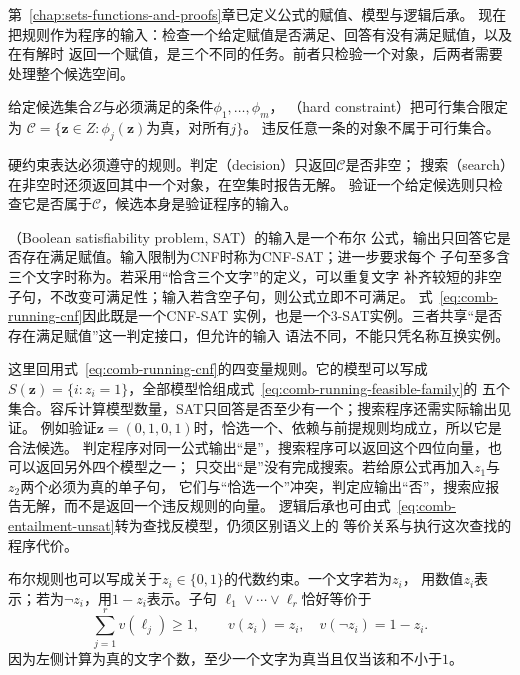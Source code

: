 第~\ref{chap:sets-functions-and-proofs}章已定义公式的赋值、模型与逻辑后承。
现在把规则作为程序的输入：检查一个给定赋值是否满足、回答有没有满足赋值，以及在有解时
返回一个赋值，是三个不同的任务。前者只检验一个对象，后两者需要处理整个候选空间。

\begin{definition}[硬约束]
\label{def:comb-hard-constraint}
给定候选集合$Z$与必须满足的条件$\phi_1,\ldots,\phi_m$，
（hard constraint）把可行集合限定为
$\mathcal C=\{\bm z\in Z:\phi_j(\bm z)\text{为真，对所有}j\}$。
违反任意一条的对象不属于可行集合。
\end{definition}
硬约束表达必须遵守的规则。判定（decision）只返回$\mathcal C$是否非空；
搜索（search）在非空时还须返回其中一个对象，在空集时报告无解。
验证一个给定候选则只检查它是否属于$\mathcal C$，候选本身是验证程序的输入。

（Boolean satisfiability problem, SAT）的输入是一个布尔
公式，输出只回答它是否存在满足赋值。输入限制为CNF时称为CNF-SAT；进一步要求每个
子句至多含三个文字时称为。若采用“恰含三个文字”的定义，可以重复文字
补齐较短的非空子句，不改变可满足性；输入若含空子句，则公式立即不可满足。
式~\eqref{eq:comb-running-cnf}因此既是一个CNF-SAT
实例，也是一个3-SAT实例。三者共享“是否存在满足赋值”这一判定接口，但允许的输入
语法不同，不能只凭名称互换实例。

这里回用式~\eqref{eq:comb-running-cnf}的四变量规则。它的模型可以写成
$S(\bm z)=\{i:z_i=1\}$，全部模型恰组成式~\eqref{eq:comb-running-feasible-family}的
五个集合。容斥计算模型数量，SAT只回答是否至少有一个；搜索程序还需实际输出见证。
例如验证$\bm z=(0,1,0,1)$时，恰选一个、依赖与前提规则均成立，所以它是合法候选。
判定程序对同一公式输出“是”，搜索程序可以返回这个四位向量，也可以返回另外四个模型之一；
只交出“是”没有完成搜索。若给原公式再加入$z_1$与$z_2$两个必须为真的单子句，
它们与“恰选一个”冲突，判定应输出“否”，搜索应报告无解，而不是返回一个违反规则的向量。
逻辑后承也可由式~\eqref{eq:comb-entailment-unsat}转为查找反模型，仍须区别语义上的
等价关系与执行这次查找的程序代价。

布尔规则也可以写成关于$z_i\in\{0,1\}$的代数约束。一个文字若为$z_i$，
用数值$z_i$表示；若为$\neg z_i$，用$1-z_i$表示。子句
$\ell_1\lor\cdots\lor\ell_r$恰好等价于
\begin{equation}
  \sum_{j=1}^{r}v(\ell_j)\geq1,
  \qquad
  v(z_i)=z_i,\quad v(\neg z_i)=1-z_i.
  \label{eq:comb-clause-linearization}
\end{equation}
因为左侧计算为真的文字个数，至少一个文字为真当且仅当该和不小于$1$。

